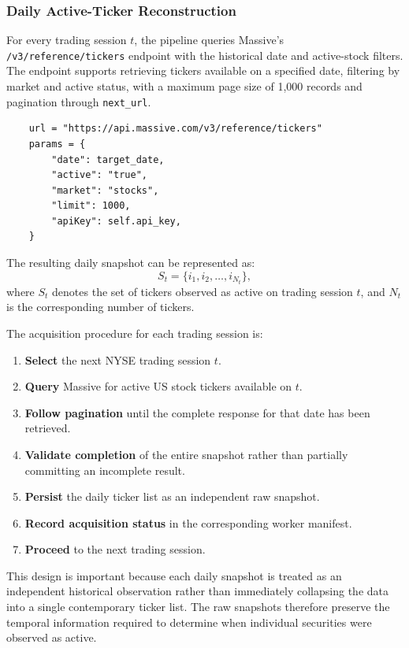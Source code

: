 \subsubsection*{Daily Active-Ticker Reconstruction}
For every trading session \(t\), the pipeline queries Massive's \texttt{/v3/reference/tickers} endpoint with the historical date and active-stock filters. The endpoint supports retrieving tickers available on a specified date, filtering by market and active status, with a maximum page size of 1{,}000 records and pagination through \texttt{next\_url}.
\begin{verbatim}
    url = "https://api.massive.com/v3/reference/tickers"
    params = {
        "date": target_date,
        "active": "true",
        "market": "stocks",
        "limit": 1000,
        "apiKey": self.api_key,
    }
\end{verbatim}
The resulting daily snapshot can be represented as:
\[
    S_t = \{i_1,i_2,\ldots,i_{N_t}\},
\]
where \(S_t\) denotes the set of tickers observed as active on trading session \(t\), and \(N_t\) is the corresponding number of tickers.

\medskip

The acquisition procedure for each trading session is:
\begin{enumerate}[topsep=0pt, parsep=0pt, itemsep=0pt]
    \item \textbf{Select} the next \acs{NYSE} trading session \(t\).
    \item \textbf{Query} Massive for active US stock tickers available on \(t\).
    \item \textbf{Follow pagination} until the complete response for that date has been retrieved.
    \item \textbf{Validate completion} of the entire snapshot rather than partially committing an incomplete result.
    \item \textbf{Persist} the daily ticker list as an independent raw snapshot.
    \item \textbf{Record acquisition status} in the corresponding worker manifest.
    \item \textbf{Proceed} to the next trading session.
\end{enumerate}

This design is important because each daily snapshot is treated as an independent historical observation rather than immediately collapsing the data into a single contemporary ticker list. The raw snapshots therefore preserve the temporal information required to determine when individual securities were observed as active.

